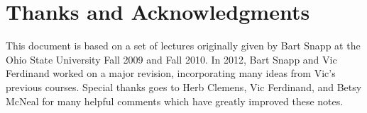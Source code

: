 \section*{Thanks and Acknowledgments}

This document is based on a set of lectures originally given by Bart
Snapp at the Ohio State University Fall 2009 and Fall 2010. In 2012,
Bart Snapp and Vic Ferdinand worked on a major revision, incorporating
many ideas from Vic's previous courses. Special thanks goes to Herb
Clemens, Vic Ferdinand, and Betsy McNeal for many helpful comments
which have greatly improved these notes.



\makeatletter %
\renewcommand{\l@section}{\@dottedtocline{1}{5em}{5em}}
\renewcommand{\l@subsection}{\@dottedtocline{2}{5em}{5em}}
\renewcommand{\l@subsubsection}{\@dottedtocline{3}{5em}{5em}}
\makeatother

\setcounter{tocdepth}{1}
\tableofcontents









